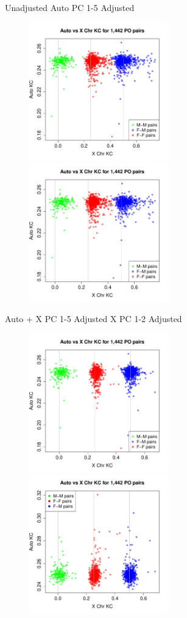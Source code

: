 \documentclass{beamer}
\begin{document}
\begin{frame}
\footnotesize 
Unadjusted \hspace{5cm} Auto PC 1-5 Adjusted
\centering
\begin{figure}
\includegraphics[height=6cm]{../kc_xPrunedvsAuto_poPairs_unadj.pdf}
\includegraphics[height=6cm]{../kc_xPrunedvsAuto_poPairs_autoPC15adj.pdf}
\end{figure}
\end{frame}

\begin{frame}
\footnotesize
Auto + X PC 1-5 Adjusted \hspace{4cm} X PC 1-2 Adjusted
\centering
\begin{figure}
\includegraphics[height=6cm]{../kc_xPrunedvsAuto_poPairs_autoXAdj.pdf}
\includegraphics[height=6cm]{../kc_xPrunedvsAuto_poPairs_xAdj.pdf}
\end{figure}
\end{frame}
\end{document}
